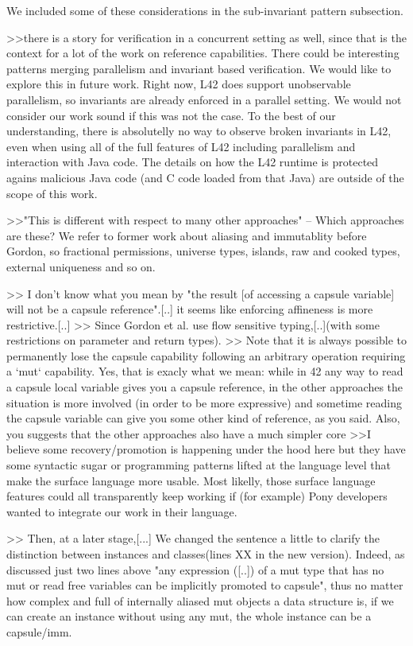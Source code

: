We included some of these considerations in the sub-invariant pattern subsection.


>>there is a story for verification in a concurrent setting as well, since that is  the context for a lot of the work on reference capabilities.
There could be interesting patterns merging parallelism and invariant based verification. We would like to explore this in future work.
Right now, L42 does support unobservable parallelism, so invariants are already enforced in a parallel setting.
We would not consider our work sound if this was not the case. To the best of our understanding, there is absolutelly no way to observe broken invariants in L42, even when using all of the full features of L42 including parallelism and interaction with Java code.
The details on how the L42 runtime is protected agains malicious Java code (and C code loaded from that Java) are outside of the scope of this work.

>>"This is different with respect to many other approaches"  -- Which approaches are these? 
We refer to former work about aliasing and immutablity before Gordon, so fractional permissions, universe types, islands, raw and cooked types, external uniqueness and so on.


>> I don't know what you mean by "the result [of accessing a capsule variable] will not be a capsule reference".[..] it seems like enforcing affineness is more restrictive.[..]
>>  Since Gordon et al. use flow sensitive typing,[..](with some restrictions on parameter and return types).
>>  Note that it is always possible to permanently lose the capsule  capability following an arbitrary operation requiring a `mut` capability.
Yes, that is exacly what we mean: while in 42 any way to read a capsule local variable gives you a capsule reference, in the other approaches the situation is more involved
 (in order to be more expressive) and sometime reading the capsule variable can give you some other kind of reference, as you said.
Also, you suggests that the other approaches also have a much simpler core 
>>I believe some recovery/promotion is happening under the hood here
but they have some syntactic sugar or programming patterns lifted at the language level that make the surface language more usable.
Most likelly, those surface language features could all transparently keep working if (for example) Pony developers wanted to integrate our work in their language.


>> Then, at a later stage,[...]
We changed the sentence a little to clarify the distinction between instances and classes(lines XX in the new version). Indeed, as discussed just two lines above
"any expression ([..]) of a mut type that has no mut or read free variables can be implicitly promoted to capsule",
thus no matter how complex and full of internally aliased mut objects a data structure is, if we can create an instance without using any mut, the whole instance can be a capsule/imm.


